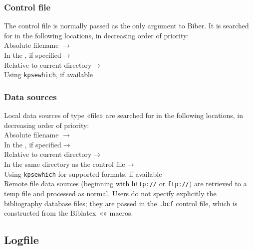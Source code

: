\documentclass{ltxdockit}
\newcommand*{\biber}{Biber\xspace}
\newcommand*{\biblatex}{Biblatex\xspace}
\begin{document}
\subsubsection{Control file}\label{loc:cf}

The control file is normally passed as the only argument to \biber. It is
searched for in the following locations, in decreasing order of
priority:\\[2ex]

\noindent Absolute filename $\rightarrow$\\
\hspace*{1em}In the , if specified$\rightarrow$\\
\hspace*{2em}Relative to current directory$\rightarrow$\\
\hspace*{3em}Using \verb+kpsewhich+, if available

\subsubsection{Data sources}

Local data sources of type «file» are searched for in the following
locations, in decreasing order of priority:\\[2ex]

\noindent Absolute filename $\rightarrow$\\
\hspace*{1em}In the , if specified$\rightarrow$\\
\hspace*{2em}Relative to current directory$\rightarrow$\\
\hspace*{3em}In the same directory as the control file$\rightarrow$\\
\hspace*{4em}Using \verb+kpsewhich+ for supported formats, if available\\[2ex]

\noindent Remote file data sources (beginning with \verb+http://+ or
\verb+ftp://+) are retrieved to a temp file and processed as normal. Users
do not specify explicitly the bibliography database files; they are passed
in the \verb+.bcf+ control file, which is constructed from the
\biblatex\ «\verb++» macros.

\subsection{Logfile}
\end{document}
